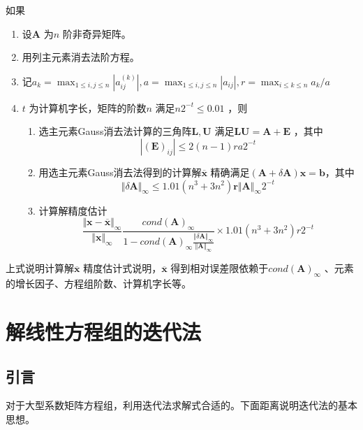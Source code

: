 \documentclass[a4paper]{article}
\begin{document}
\begin{theorem}
	如果
	\begin{enumerate}
		\item 设$\mathbf{A}$ 为$n$ 阶非奇异矩阵。
		\item 用列主元素消去法阶方程。
		\item 记$a_k = \max_{1 \le i,j \le n} | a_{ij}^{(k)} |, a = \max_{1 \le i,j \le n} | a_{ij} |, r = \max_{i \le k \le n} a_k / a$
		\item $t$ 为计算机字长，矩阵的阶数$n$ 满足$n 2^{-t} \le 0.01$ ，则
			\begin{enumerate}
				\item 选主元素Gauss消去法计算的三角阵$\mathbf{L,U}$ 满足$\mathbf{LU} = \mathbf{A} + \mathbf{E}$ ，其中
					\[
						| (\mathbf{E})_{ij} | \le 2 (n-1) r a 2^{-t}
					\] 
				\item 用选主元素Gauss消去法得到的计算解$\mathbf{\overline{x}}$ 精确满足$(\mathbf{A} + \delta \mathbf{A}) \mathbf{x} = \mathbf{b}$，其中
					\[
					\Vert \delta \mathbf{A} \Vert_\infty \le 1.01 (n^3 + 3 n^2) \mathbf{r} \Vert \mathbf{A} \Vert_\infty 2^{-t}
					\] 
				\item 计算解精度估计
					\[
					\frac{\Vert \mathbf{x - \overline{x}} \Vert_\infty}{\Vert \mathbf{x} \Vert_\infty} \frac{cond(\mathbf{A})_\infty}{1 - cond(\mathbf{A})_\infty \frac{\Vert \delta \mathbf{A} \Vert_\infty}{\Vert \mathbf{A} \Vert_\infty}} \times 1.01 (n^3 + 3 n^2) r 2^{-t}
					\] 
			\end{enumerate}
	\end{enumerate}
\end{theorem}
上式说明计算解$\mathbf{\overline{x}}$ 精度估计式说明，$\mathbf{\overline{x}}$ 得到相对误差限依赖于$cond(\mathbf{A})_\infty$ 、元素的增长因子、方程组阶数、计算机字长等。

\section{解线性方程组的迭代法}
\subsection{引言}
对于大型系数矩阵方程组，利用迭代法求解式合适的。下面距离说明迭代法的基本思想。
\end{document}
